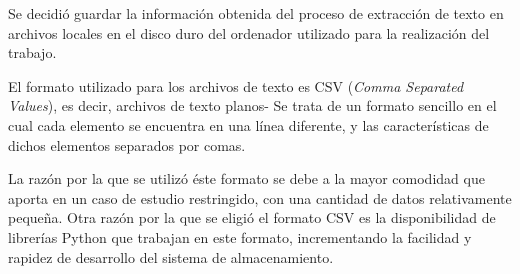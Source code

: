 \lhead{\emph{\ChapterTwo{}}}
Se decidió guardar la información obtenida del proceso de extracción de texto en archivos locales en el disco duro del ordenador utilizado para la realización del trabajo.

El formato utilizado para los archivos de texto es CSV (\textit{Comma Separated Values}), es decir, archivos de texto planos-
%
Se trata de un formato sencillo en el cual cada elemento se encuentra en una línea diferente, y las características de dichos elementos separados por comas.

La razón por la que se utilizó éste formato se debe a la mayor comodidad que aporta en un caso de estudio restringido, con una cantidad de datos relativamente pequeña.
%
Otra razón por la que se eligió el formato CSV es la disponibilidad de librerías Python que trabajan en este formato, incrementando la facilidad y rapidez de desarrollo del sistema de almacenamiento.